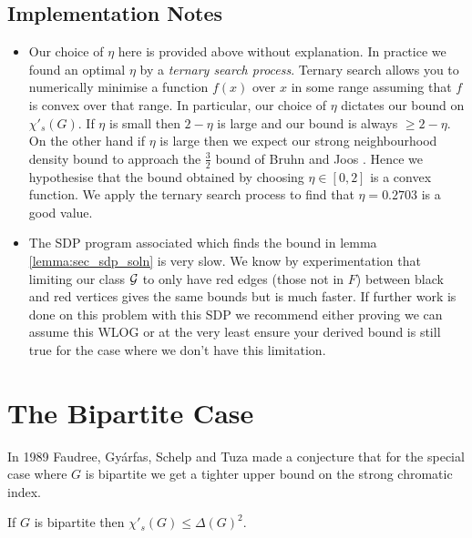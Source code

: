 \subsection{Implementation Notes}
\label{sec:sec_impl_notes}

\begin{itemize}
    \item Our choice of $\eta$ here is provided above without explanation. In practice we found
        an optimal $\eta$ by a \textit{ternary search process}. Ternary search allows you to
        numerically minimise a function $f(x)$ over $x$ in some range assuming that $f$ is
        convex over that range. In particular, our choice of $\eta$ dictates our bound on
        $\chi'_s(G)$. If $\eta$ is small then $2-\eta$ is large and our bound is always $\geq
        2-\eta$. On the other hand if $\eta$ is large then we expect our strong neighbourhood
        density bound to approach the $\frac{3}{2}$ bound of Bruhn and Joos
        \cite{bruhnStrongerBoundStrong2018}. Hence we hypothesise that the bound obtained by
        choosing $\eta \in [0,2]$ is a convex function. We apply the ternary search process
        to find that $\eta=0.2703$ is a good value.
    \item The SDP program associated which finds the bound in lemma
        \ref{lemma:sec_sdp_soln} is very slow. We know by experimentation that limiting
        our class $\mathcal{G}$ to only have red edges (those not in $F$) between black and red vertices
        gives the same bounds but is much faster. If further work is done on this problem
        with this SDP we recommend either proving we can assume this WLOG or at the very least
        ensure your derived bound is still true for the case where we don't have this limitation.
\end{itemize}

\section{The Bipartite Case}
\label{sec:sec_bipartite}

In 1989 Faudree, Gyárfas, Schelp and Tuza
made a conjecture that for the special case where $G$ is bipartite we get a tighter
upper bound on the strong chromatic index.

\begin{knownconjecture}
    If $G$ is bipartite then $\chi'_s(G) \leq \Delta(G)^2$.
\end{knownconjecture}

